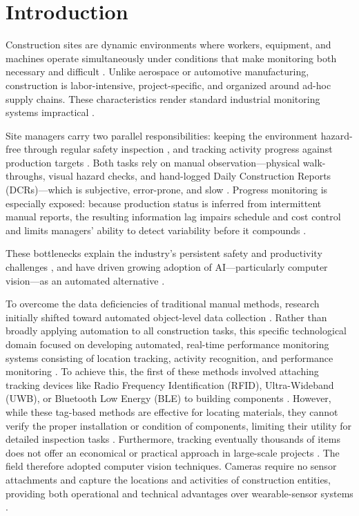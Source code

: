 \documentclass[10pt,letterpaper]{article}
\begin{document}
\section{Introduction}

Construction sites are dynamic environments where workers, equipment, and machines operate simultaneously under conditions that make monitoring both necessary and difficult \cite{alaloul2022}. Unlike aerospace or automotive manufacturing, construction is labor-intensive, project-specific, and organized around ad-hoc supply chains. These characteristics render standard industrial monitoring systems impractical \cite{davila2021,alaloul2022}.

Site managers carry two parallel responsibilities: keeping the environment hazard-free through regular safety inspection \cite{asadzadeh2020}, and tracking activity progress against production targets \cite{alaloul2022}. Both tasks rely on manual observation---physical walk-throughs, visual hazard checks, and hand-logged Daily Construction Reports (DCRs)---which is subjective, error-prone, and slow \cite{samsami2024}. Progress monitoring is especially exposed: because production status is inferred from intermittent manual reports, the resulting information lag impairs schedule and cost control and limits managers' ability to detect variability before it compounds \cite{sherafat2020}.

These bottlenecks explain the industry's persistent safety and productivity challenges \cite{jiang2023}, and have driven growing adoption of AI---particularly computer vision---as an automated alternative \cite{rabbi2024,paneru2021}.

To overcome the data deficiencies of traditional manual methods, research initially shifted toward automated object-level data collection \cite{tuomisto2026}. Rather than broadly applying automation to all construction tasks, this specific technological domain focused on developing automated, real-time performance monitoring systems consisting of location tracking, activity recognition, and performance monitoring \cite{sherafat2020}. To achieve this, the first of these methods involved attaching tracking devices like Radio Frequency Identification (RFID), Ultra-Wideband (UWB), or Bluetooth Low Energy (BLE) to building components \cite{asadzadeh2020}. However, while these tag-based methods are effective for locating materials, they cannot verify the proper installation or condition of components, limiting their utility for detailed inspection tasks \cite{sherafat2020}. Furthermore, tracking eventually thousands of items does not offer an economical or practical approach in large-scale projects \cite{bohn2010}. The field therefore adopted computer vision techniques. Cameras require no sensor attachments and capture the locations and activities of construction entities, providing both operational and technical advantages over wearable-sensor systems \cite{xiong2019}.
\end{document}
